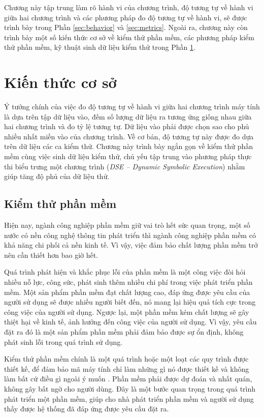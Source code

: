 Chương này tập trung làm rõ hành vi của chương trình, độ tương tự về
hành vi giữa hai chương trình và các phương pháp đo độ tương tự về
hành vi, sẽ được trình bày trong Phần \ref{sec:behavior} và
\ref{sec:metrics}. Ngoài ra, chương này còn trình bày một số kiến thức
cơ sở về kiểm thử phần mềm, các phương pháp kiểm thử phần mềm, kỹ
thuật sinh dữ liệu kiểm thử trong Phần \ref{sec:base}.

\section{Kiến thức cơ sở}
\label{sec:base}

Ý tưởng chính của việc đo độ tương tự về hành vi giữa hai chương trình
máy tính là dựa trên tập dữ liệu vào, đếm số lượng dữ liệu ra tương
ứng giống nhau giữa hai chương trình và đo tỷ lệ tương tự. Dữ liệu vào
phải được chọn sao cho phủ nhiều nhất miền vào của chương trình. Về cơ
bản, độ tương tự này được đo dựa trên dữ liệu các ca kiểm thử. Chương
này trình bày ngắn gọn về kiểm thử phần mềm cùng việc sinh dữ liệu
kiểm thử, chủ yếu tập trung vào phương pháp thực thi biểu trưng một
chương trình (\emph{DSE -- Dynamic Symbolic Execution}) nhằm giúp tăng độ phủ
của dữ liệu thử.

\subsection{Kiểm thử phần mềm}
Hiện nay, ngành công nghiệp phần mềm giữ vai trò hết sức quan trọng, một số nước có nền công nghệ thông tin phát triển thì ngành công nghiệp phần mềm có khả năng chi phối cả nền kinh tế. Vì vậy,  việc đảm bảo chất lượng phần mềm trở nên cần thiết hơn bao giờ hết.

Quá trình phát hiện và khắc phục lỗi của phần mềm là một công việc đòi hỏi nhiều nỗ lực, công sức, phát sinh thêm nhiều chi phí trong việc phát triển phần mềm. Một sản phẩm phần mềm đạt chất lượng cao, đáp ứng được yêu cầu của người sử dụng sẽ được nhiều người biết đến, nó mang lại hiệu quả tích cực trong công việc của người sử dụng. Ngược lại, một phần mềm kém chất lượng sẽ gây thiệt hại về kinh tế, ảnh hưởng đến công việc của người sử dụng. Vì vậy, yêu cầu đặt ra đó là một sản phẩm phần mềm phải đảm bảo được sự ổn định, không phát sinh lỗi trong quá trình sử dụng.

Kiểm thử phần mềm chính là một quá trình hoặc một loạt các quy trình được thiết kế, để đảm bảo mã máy tính chỉ làm những gì nó được thiết kế và không làm bất cứ điều gì ngoài ý muốn \cite{myers2011art}. Phần mềm phải được dự đoán và nhất quán, không gây bất ngờ cho người dùng. Đây là một bước quan trọng trong quá trình phát triển một phần mềm, giúp cho nhà phát triển phần mềm và người sử dụng thấy được hệ thống đã đáp ứng được yêu cầu đặt ra.

